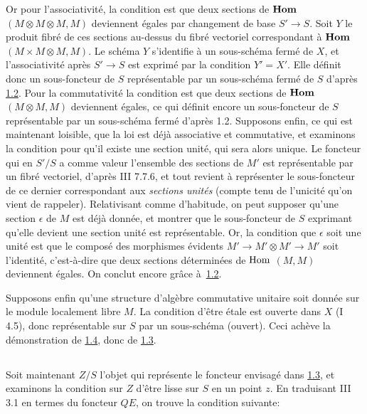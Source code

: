 \documentclass[10pt]{../fichiers-configuration-latex/smfart}
\begin{document}
Or pour l'associativité, la condition est que deux sections de
$\operatorname{\mathbf{Hom}}$ $(M\otimes M\otimes M, M)$ deviennent égales par changement
de base $S'\rightarrow S$. Soit $Y$ le produit fibré de ces sections
au-dessus du fibré vectoriel correspondant à $\operatorname{\mathbf{Hom}}$ $(M\times
M\otimes M, M)$. Le schéma $Y$ s'identifie à un sous-schéma fermé de
$X$, et l'associativité après $S'\rightarrow S$ est exprimé par la
condition $Y'=X'$. Elle définit donc un sous-foncteur de $S$
représentable par un sous-schéma fermé de $S$ d'après \hyperref[XIII.lem1.2]{1.2}. Pour la
commutativité la condition est que deux sections de $\operatorname{\mathbf{Hom}}$
$(M\otimes M,M)$ deviennent égales, ce qui définit encore un
sous-foncteur de $S$ représentable par un sous-schéma fermé d'après
1.2. Supposons enfin, ce qui est maintenant loisible, que la loi est
déjà associative et commutative, et examinons la condition pour qu'il
existe une section unité, qui sera alors unique. Le foncteur qui en
$S'/S$ a comme valeur l'ensemble des sections de $M'$ est
représentable par un fibré vectoriel, d'après \EGA III 7.7.6, et tout
revient à représenter le sous-foncteur de ce dernier correspondant aux
\emph{sections unités} (compte tenu de l'unicité qu'on vient de
rappeler). Relativisant comme d'habitude, on peut supposer qu'une
section $\epsilon$ de $M$ est déjà donnée, et montrer que le
sous-foncteur de $S$ exprimant qu'elle devient une\pageoriginale
section unité est représentable. Or, la condition que $\epsilon$ soit
une unité est que le composé des morphismes évidents $M'\rightarrow
M'\otimes M'\rightarrow M'$ soit l'identité, c'est-à-dire que deux
sections déterminées de $\operatorname{Hom}$ $(M,M)$ deviennent égales. On conclut
encore grâce à~\hyperref[XIII.lem1.2]{1.2}.

Supposons enfin qu'une structure d'algèbre commutative unitaire soit
donnée sur le module localement libre $M$. La condition d'être étale
est ouverte dans $X$ (\SGA I 4.5), donc représentable sur $S$ par un
sous-schéma (ouvert). Ceci achève la démonstration de \hyperref[XIII.lem1.4]{1.4}, donc de
\hyperref[XIII.lem1.3]{1.3}.

\setcounter{subsection}{4}
\subsection{}
Soit maintenant $Z/S$ l'objet qui représente le foncteur envisagé dans
\hyperref[XIII.lem1.3]{1.3}, et examinons la condition sur $Z$ d'être lisse sur $S$ en un
point $z$. En traduisant  III 3.1 en termes du foncteur $QE$, on
trouve la condition suivante:
\end{document}

